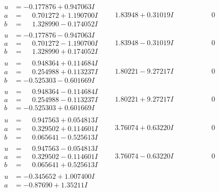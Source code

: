 \documentclass[1p]{elsarticle_modified}
\theoremstyle{definition}
\begin{document}
$$\begin{array}{c|c|c}
\begin{aligned}
u &= -0.177876 + 0.947063 I \\
a &= \phantom{-}0.701272 + 1.190700 I \\
b &= \phantom{-}1.328990 - 0.174052 I\end{aligned}
 & \phantom{-}1.83948 + 0.31019 I & \phantom{-0.000000 } 0 \\ \hline\begin{aligned}
u &= -0.177876 - 0.947063 I \\
a &= \phantom{-}0.701272 - 1.190700 I \\
b &= \phantom{-}1.328990 + 0.174052 I\end{aligned}
 & \phantom{-}1.83948 - 0.31019 I & \phantom{-0.000000 } 0 \\ \hline\begin{aligned}
u &= \phantom{-}0.948364 + 0.114684 I \\
a &= \phantom{-}0.254988 + 0.113237 I \\
b &= -0.525303 - 0.601669 I\end{aligned}
 & \phantom{-}1.80221 - 9.27217 I & \phantom{-0.000000 } 0 \\ \hline\begin{aligned}
u &= \phantom{-}0.948364 - 0.114684 I \\
a &= \phantom{-}0.254988 - 0.113237 I \\
b &= -0.525303 + 0.601669 I\end{aligned}
 & \phantom{-}1.80221 + 9.27217 I & \phantom{-0.000000 } 0 \\ \hline\begin{aligned}
u &= \phantom{-}0.947563 + 0.054813 I \\
a &= \phantom{-}0.329502 + 0.114601 I \\
b &= \phantom{-}0.065641 - 0.525613 I\end{aligned}
 & \phantom{-}3.76074 + 0.63220 I & \phantom{-0.000000 } 0 \\ \hline\begin{aligned}
u &= \phantom{-}0.947563 - 0.054813 I \\
a &= \phantom{-}0.329502 - 0.114601 I \\
b &= \phantom{-}0.065641 + 0.525613 I\end{aligned}
 & \phantom{-}3.76074 - 0.63220 I & \phantom{-0.000000 } 0 \\ \hline\begin{aligned}
u &= -0.345652 + 1.007400 I \\
a &= -0.87690 + 1.35211 I \\

\end{aligned}
\end{array}$$
\end{document}
